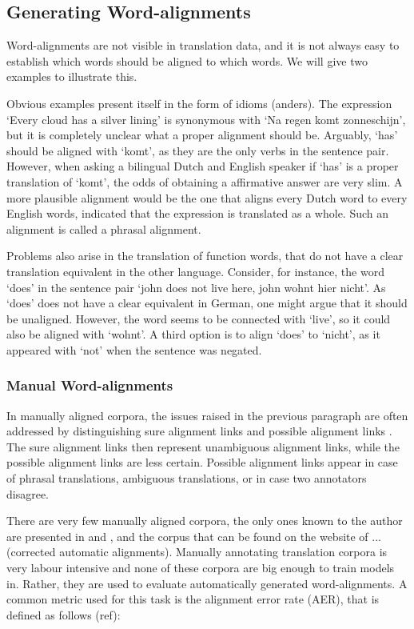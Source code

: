 \documentclass{report}
\theoremstyle{definition}
\theoremstyle{plain}
\begin{document}
\subsection{Generating Word-alignments}

Word-alignments are not visible in translation data, and it is not always easy to establish which words should be aligned to which words. We will give two examples to illustrate this.

Obvious examples present itself in the form of idioms (anders). The expression `Every cloud has a silver lining'  is synonymous with `Na regen komt zonneschijn', but it is completely unclear what a proper alignment should be. Arguably, `has' should be aligned with `komt', as they are the only verbs in the sentence pair. However, when asking a bilingual Dutch and English speaker if `has' is a proper translation of `komt', the odds of obtaining a affirmative answer are very slim. A more plausible alignment would be the one that aligns every Dutch word to every English words, indicated that the expression is translated as a whole. Such an alignment is called a phrasal alignment.

Problems also arise in the translation of function words, that do not have a clear translation equivalent in the other language. Consider, for instance, the word `does' in the sentence pair `john does not live here, john wohnt hier nicht'. As `does' does not have a clear equivalent in German, one might argue that it should be unaligned. However, the word seems to be connected with `live', so it could also be aligned with `wohnt'. A third option is to align `does' to `nicht', as it appeared with `not' when the sentence was negated.\citep[Example from][p.114]{koehn2008statistical}

\subsubsection{Manual Word-alignments}

In manually aligned corpora, the issues raised in the previous paragraph are often addressed by distinguishing sure alignment links and possible alignment links \citep{lambert2005guidelines}. The sure alignment links then represent unambiguous alignment links, while the possible alignment links are less certain. Possible alignment links appear in case of phrasal translations, ambiguous translations, or in case two annotators disagree. 

There are very few manually aligned corpora, the only ones known to the author are presented in \cite{och2000improved} and \cite{graca2008building}, and the corpus that can be found on the website of ... (corrected automatic alignments).%
 Manually annotating translation corpora is very labour intensive and none of these corpora are big enough to train models in. Rather, they are used to evaluate automatically generated word-alignments. A common metric used for this task is the alignment error rate (AER), that is defined as follows (ref):
\end{document}
